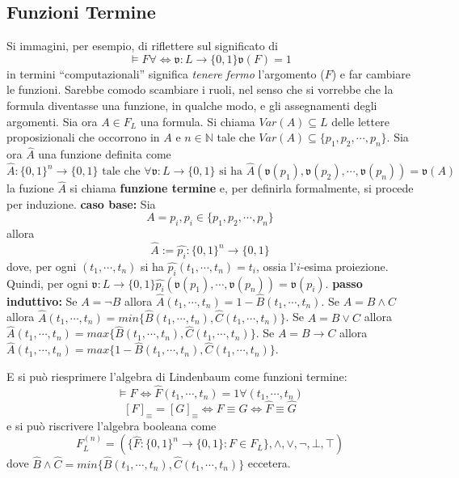 \subsection{Funzioni Termine}
Si immagini, per esempio, di riflettere sul significato di 
$$
\models F \forall \iff \mathfrak{v}: L \rightarrow \{0,1\} \mathfrak{v}(F) = 1
$$
in termini ``computazionali'' significa \textit{tenere fermo} l'argomento 
($F$) e far cambiare le funzioni. Sarebbe comodo scambiare i ruoli, nel 
senso che si vorrebbe che la formula diventasse una funzione, in qualche modo,
e gli assegnamenti degli argomenti. 
Sia ora $A \in F_L$ una formula. Si chiama $Var(A) \subseteq L$ delle lettere 
proposizionali che occorrono in $A$ e $n \in \mathbb{N}$ tale che 
$Var(A) \subseteq \{p_1, p_2, \cdots, p_n\}$.  Sia ora $\hat{A}$ una funzione 
definita come 
$$
\hat{A} : \{0,1\}^n \rightarrow \{0,1\} \text{ tale che } \forall \mathfrak{v}:L \rightarrow \{0,1\}\text{ si ha } \hat{A}(\mathfrak{v}(p_1), \mathfrak{v}(p_2), \cdots, \mathfrak{v}(p_n)) = \mathfrak{v}(A)
$$
la fuzione $\hat{A}$ si chiama \textbf{funzione termine} e, per definirla formalmente, 
si procede per induzione. 
\textbf{caso base:} 
Sia 
$$
A = p_i, p_i \in \{p_1, p_2, \cdots, p_n\}
$$
allora 
$$
\hat{A} := \hat{p_i} : \{0,1\}^n \rightarrow \{0,1\}
$$ 
dove, per ogni $(t_1, \cdots, t_n)$ si ha $\hat{p_i}(t_1, \cdots, t_n) = t_i$, 
ossia l'$i$-esima proiezione. Quindi, per ogni 
$\mathfrak{v}: L \rightarrow \{0,1\} \hat{p_i}(\mathfrak{v}(p_1), \cdots, \mathfrak{v}(p_n)) = \mathfrak{v}(p_i)$. 
\noindent
\textbf{passo induttivo:}
Se $A = \neg B$ allora $\hat{A}(t_1, \cdots, t_n) =  1 - \hat{B}(t_1, \cdots, t_n)$. 
Se $A = B \land C$ allora $\hat{A}(t_1, \cdots, t_n) = min \{\hat{B}(t_1, \cdots, t_n), \hat{C}(t_1, \cdots, t_n)\}$. 
Se $A = B \lor C$ allora $\hat{A}(t_1, \cdots, t_n) = max \{\hat{B}(t_1, \cdots, t_n), \hat{C}(t_1, \cdots, t_n)\}$. 
Se $A = B \rightarrow C$ allora $\hat{A}(t_1, \cdots, t_n) = max \{1 - \hat{B}(t_1, \cdots, t_n), \hat{C}(t_1, \cdots, t_n)\}$. 

E si può riesprimere l'algebra di Lindenbaum come funzioni termine: 
$$
\models F \iff \hat{F}(t_1, \cdots, t_n) = 1 \forall (t_1, \cdots, t_n)
$$
$$
[F]_{\equiv} = [G]_{\equiv} \iff F \equiv G \iff \hat{F} \equiv \hat{G}
$$
e si può riscrivere l'algebra booleana come 
$$
F_L^{(n)} = (\{\hat{F}:\{0,1\}^n \rightarrow \{0,1\}: F \in F_L\}, \land, \lor, \neg, \bot, \top)
$$
dove 
$\hat{B} \land \hat{C} = min \{\hat{B}(t_1, \cdots, t_n), \hat{C}(t_1, \cdots, t_n)\}$
eccetera. 

